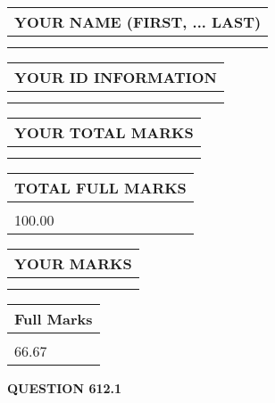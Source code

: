 \documentclass{ctexart}
\begin{document}
   
   
   
\newpage 
\setcounter{page}{ 
   612001 } 
   
   
   
   
\noindent\begin{tabular}{|l|}
\hline
YOUR NAME (FIRST, ... LAST)  \\
\hline
 \\ 
 \\ 
\hline
\end{tabular}
\hspace{0.05in} \begin{tabular}{|l|}
\hline
 YOUR   ID   INFORMATION  \\
\hline
 \\ 
 \\ 
\hline
\end{tabular}
   
   
\vspace{0.2in}\noindent\begin{tabular}{|l|}
\hline
YOUR TOTAL MARKS  \\
\hline
 \\ 
 \\ 
\hline
\end{tabular}
\hspace{0.05in} \begin{tabular}{|l|}
\hline
TOTAL FULL MARKS  \\
\hline
 \\ 
100.00 \\
\hline
\end{tabular}
   
   
 \vspace{0.2in}
 
 
 
 
   
   
  
\vspace{0.2in}
  
\noindent\begin{tabular}{|l|}
\hline
 YOUR MARKS  \\
\hline
 \\ 
 \\ 
\hline
\end{tabular}
\hspace{0.05in} \begin{tabular}{|l|}
\hline
 Full Marks  \\
\hline
 \\ 
66.67 \\
\hline
\end{tabular}
{\textbf{\Large{QUESTION
612.1 
}}}
  
\end{document}
